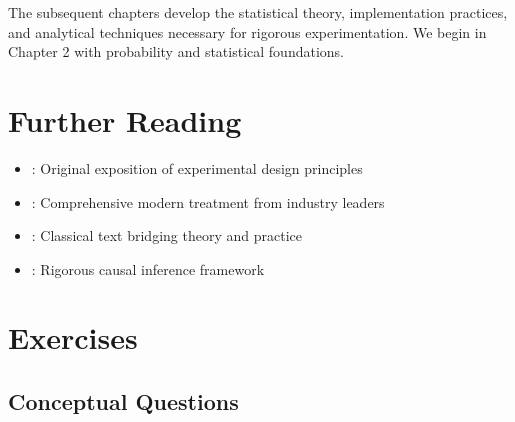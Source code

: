The subsequent chapters develop the statistical theory, implementation practices, and analytical techniques necessary for rigorous experimentation. We begin in Chapter 2 with probability and statistical foundations.

\section{Further Reading}

\begin{itemize}
    \item \cite{fisher1935design}: Original exposition of experimental design principles
    \item \cite{kohavi2020trustworthy}: Comprehensive modern treatment from industry leaders
    \item \cite{box2005statistics}: Classical text bridging theory and practice
    \item \cite{imbens2015causal}: Rigorous causal inference framework
\end{itemize}

\section{Exercises}

\subsection{Conceptual Questions}

